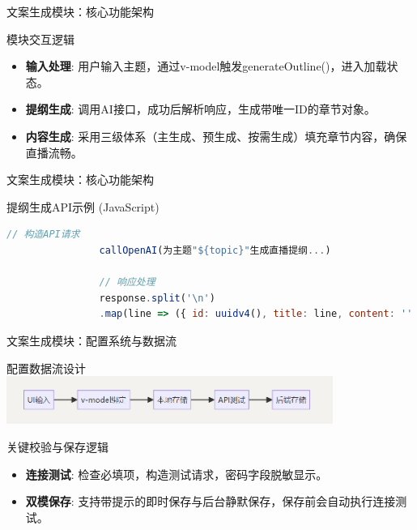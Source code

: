 \documentclass{beamer}
\begin{document}
	\begin{frame}[fragile]{文案生成模块：核心功能架构}
		\begin{block}{模块交互逻辑}
			\begin{itemize}
				\item \textbf{输入处理}: 用户输入主题，通过v-model触发generateOutline()，进入加载状态。
				\item \textbf{提纲生成}: 调用AI接口，成功后解析响应，生成带唯一ID的章节对象。
				\item \textbf{内容生成}: 采用三级体系（主生成、预生成、按需生成）填充章节内容，确保直播流畅。
			\end{itemize}
		\end{block}
	\end{frame}
	
	
	\begin{frame}[fragile]{文案生成模块：核心功能架构}
		\begin{block}{提纲生成API示例 (JavaScript)}
			\begin{lstlisting}[language=JavaScript]
				// 构造API请求
				callOpenAI(为主题"${topic}"生成直播提纲...)
				
				// 响应处理
				response.split('\n')
				.map(line => ({ id: uuidv4(), title: line, content: '' }))
			\end{lstlisting}
		\end{block}
	\end{frame}
	
	\begin{frame}{文案生成模块：配置系统与数据流}
		\begin{block}{配置数据流设计}
			\centering
			\includegraphics[width=0.8\textwidth]{pic/copywriting_flow.png}
		\end{block}
		\begin{exampleblock}{关键校验与保存逻辑}
			\begin{itemize}
				\item \textbf{连接测试}: 检查必填项，构造测试请求，密码字段脱敏显示。
				\item \textbf{双模保存}: 支持带提示的即时保存与后台静默保存，保存前会自动执行连接测试。
			\end{itemize}
		\end{exampleblock}
	\end{frame}
	
\end{document}
